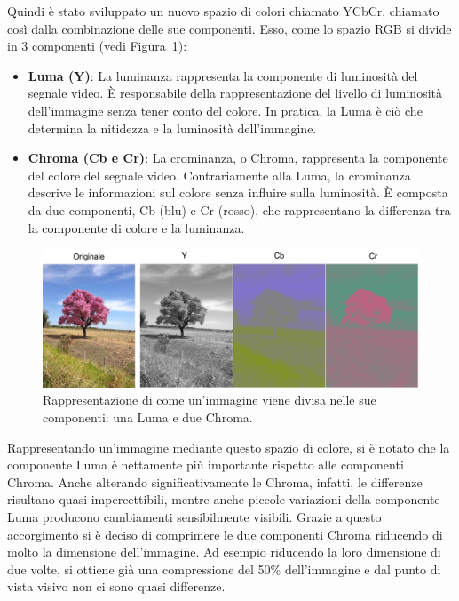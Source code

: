 \documentclass[a4paper,12pt, oneside]{article}
\begin{document}
Quindi è stato sviluppato un nuovo spazio di colori chiamato YCbCr, chiamato così dalla combinazione
delle sue componenti. Esso, come lo spazio RGB si divide in 3 componenti (vedi Figura~\ref{fig:n_YCbCr}):

\begin{itemize}
    \item \textbf{Luma (Y)}: La luminanza rappresenta la componente di luminosità del segnale video.
    È responsabile della rappresentazione del livello di luminosità dell'immagine senza tener conto
    del colore. In pratica, la Luma è ciò che determina la nitidezza e la luminosità dell'immagine.
    \item \textbf{Chroma (Cb e Cr)}: La crominanza, o Chroma, rappresenta la componente del colore
    del segnale video. Contrariamente alla Luma, la crominanza descrive le informazioni sul colore
    senza influire sulla luminosità. È composta da due componenti, Cb (blu) e Cr (rosso), che
    rappresentano la differenza tra la componente di colore e la luminanza.
\end{itemize}

\begin{figure}[h]
    \centering
    \includegraphics[width=1\textwidth]{images/n-YCbCr.png}
    \caption{Rappresentazione di come un'immagine viene divisa nelle sue componenti: una Luma e due
    Chroma.}
    \label{fig:n_YCbCr}
\end{figure}

Rappresentando un'immagine mediante questo spazio di colore, si è notato che la componente Luma è
nettamente più importante rispetto alle componenti Chroma. Anche alterando significativamente le
Chroma, infatti, le differenze risultano quasi impercettibili, mentre anche piccole variazioni
della componente Luma producono cambiamenti sensibilmente visibili.
Grazie a questo accorgimento si è deciso di comprimere le due componenti Chroma riducendo di molto
la dimensione dell'immagine. Ad esempio riducendo la loro dimensione di due volte, si ottiene già
una compressione del 50\% dell'immagine e dal punto di vista visivo non ci sono quasi differenze.
\end{document}
